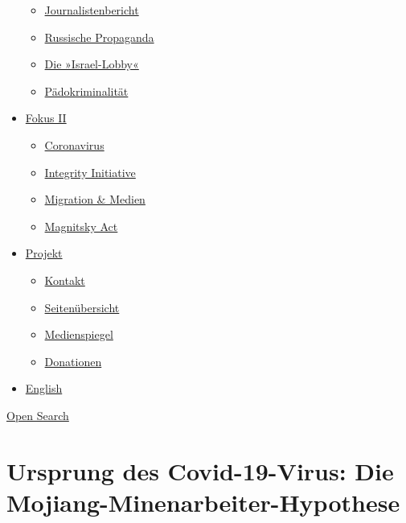 \begin{itemize}
  \begin{itemize}
  \tightlist
  \item
    \href{https://swprs.org/bericht-eines-journalisten/}{Journalistenbericht}
  \item
    \href{https://swprs.org/russische-propaganda/}{Russische Propaganda}
  \item
    \href{https://swprs.org/die-israel-lobby-fakten-und-mythen/}{Die
    »Israel-Lobby«}
  \item
    \href{https://swprs.org/geopolitik-und-paedokriminalitaet/}{Pädokriminalität}
  \end{itemize}
\item
  \href{https://swprs.org/migration-und-medien/}{Fokus II}

  \begin{itemize}
  \tightlist
  \item
    \href{https://swprs.org/covid-19-hinweis-ii/}{Coronavirus}
  \item
    \href{https://swprs.org/die-integrity-initiative/}{Integrity
    Initiative}
  \item
    \href{https://swprs.org/migration-und-medien/}{Migration \& Medien}
  \item
    \href{https://swprs.org/der-fall-magnitsky/}{Magnitsky Act}
  \end{itemize}
\item
  \href{https://swprs.org/kontakt/}{Projekt}

  \begin{itemize}
  \tightlist
  \item
    \href{https://swprs.org/kontakt/}{Kontakt}
  \item
    \href{https://swprs.org/uebersicht/}{Seitenübersicht}
  \item
    \href{https://swprs.org/medienspiegel/}{Medienspiegel}
  \item
    \href{https://swprs.org/donationen/}{Donationen}
  \end{itemize}
\item
  \href{https://swprs.org/contact/}{English}
\end{itemize}

\protect\hyperlink{}{Open Search}

\hypertarget{ursprung-des-covid-19-virus-die-mojiang-minenarbeiter-hypothese}{%
\section{Ursprung des Covid-19-Virus: Die
Mojiang-Minenarbeiter-Hypothese}\label{ursprung-des-covid-19-virus-die-mojiang-minenarbeiter-hypothese}}

